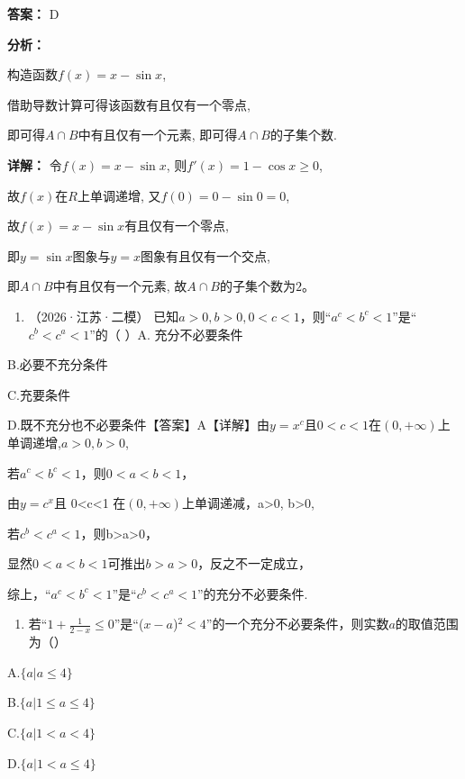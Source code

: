 \documentclass[11pt,a4paper]{ctexart}
\begin{document}
\textbf{答案：}
D

\textbf{分析：}

构造函数\(f(x) = x - \sin x\),

借助导数计算可得该函数有且仅有一个零点,

即可得\(A \cap B\)中有且仅有一个元素, 即可得\(A \cap B\)的子集个数.

\textbf{详解：}
令\(f(x) = x - \sin x\), 则\(f'(x) = 1 - \cos x \geq 0\),

故\(f(x)\)在\(R\)上单调递增, 又\(f(0) = 0 - \sin 0 = 0\),

故\(f(x) = x - \sin x\)有且仅有一个零点,

即\(y = \sin x\)图象与\(y = x\)图象有且仅有一个交点,

即\(A \cap B\)中有且仅有一个元素, 故\(A \cap B\)的子集个数为\(2\)。

\begin{enumerate}[label=\arabic*., leftmargin=*, start=8]
\item （2026·江苏·二模）
  已知\(a>0,b>0,0<c<1\)，则``\(a^c<b^c<1\)''是``\(c^b<c^a<1\)''的（ ）A.
  充分不必要条件
\end{enumerate}

B.必要不充分条件

C.充要条件

D.既不充分也不必要条件【答案】A【详解】由\(y = x^c\)且\(0 < c < 1\)在\((0, +\infty)\)上单调递增,\(a > 0, b > 0\),

若\(a^c < b^c < 1\)，则\(0 < a < b < 1\)，

由\(y=c^{x}\)且 0\textless c\textless1
在\((0,+\infty)\)上单调递减，a\textgreater0, b\textgreater0,

若\(c^{b}<c^{a}<1\)，则b\textgreater a\textgreater0，

显然\(0 < a < b < 1\)可推出\(b > a > 0\)，反之不一定成立，

综上，``\(a^{c}<b^{c}<1\)''是``\(c^{b}<c^{a}<1\)''的充分不必要条件.

\begin{enumerate}[label=\arabic*., leftmargin=*, start=9]
\item 若``\(1 + \frac{1}{2 - x} \leq 0\)''是``(\(x - a\))\(^2 < 4\)''的一个充分不必要条件，则实数\(a\)的取值范围为（）
\end{enumerate}

A.\(\{a | a \leq 4\}\)

B.\(\{a|1\leq a\leq 4\}\)

C.\(\{a|1 < a < 4\}\)

D.\(\{a|1 < a \leq 4\}\)
\end{document}
